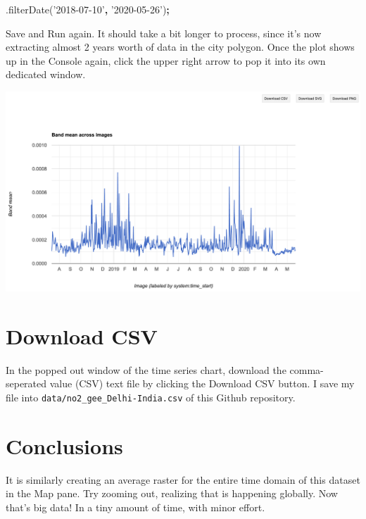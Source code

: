 \documentclass[]{book}
\newenvironment{Shaded}{\begin{snugshade}}{\end{snugshade}}
\newcommand{\AttributeTok}[1]{\textcolor[rgb]{0.77,0.63,0.00}{#1}}
\newcommand{\NormalTok}[1]{#1}
\newcommand{\OperatorTok}[1]{\textcolor[rgb]{0.81,0.36,0.00}{\textbf{#1}}}
\newcommand{\StringTok}[1]{\textcolor[rgb]{0.31,0.60,0.02}{#1}}
\begin{document}
\begin{Shaded}
\begin{Highlighting}[]
\NormalTok{  .}\AttributeTok{filterDate}\NormalTok{(}\StringTok{'2018-07-10'}\OperatorTok{,} \StringTok{'2020-05-26'}\NormalTok{)}\OperatorTok{;}
\end{Highlighting}
\end{Shaded}

Save and Run again. It should take a bit longer to process, since it's now extracting almost 2 years worth of data in the city polygon. Once the plot shows up in the Console again, click the upper right arrow to pop it into its own dedicated window.

\includegraphics{images/gee_ts-chart_all-popout.png}

\hypertarget{download-csv}{%
\section{Download CSV}\label{download-csv}}

In the popped out window of the time series chart, download the comma-seperated value (CSV) text file by clicking the {Download CSV} button. I save my file into \texttt{data/no2\_gee\_Delhi-India.csv} of this Github repository.

\hypertarget{conclusions}{%
\section*{Conclusions}\label{conclusions}}

It is similarly creating an average raster for the entire time domain of this dataset in the Map pane. Try zooming out, realizing that is happening globally. Now that's big data! In a tiny amount of time, with minor effort.
\end{document}
